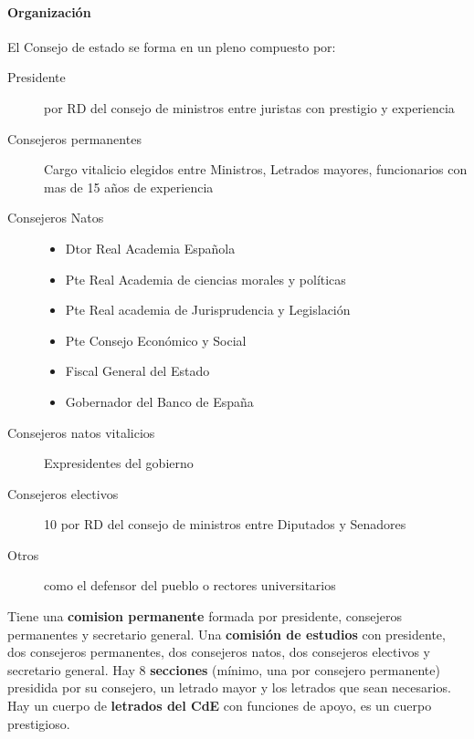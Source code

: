         \paragraph{Organización}
            El Consejo de estado se forma en un pleno compuesto por:
            \begin{description}
                \item[Presidente] por RD del consejo de ministros entre juristas con prestigio y experiencia
                \item[Consejeros permanentes] Cargo vitalicio elegidos entre Ministros, Letrados mayores, funcionarios con mas de 15 años de experiencia
                \item[Consejeros Natos] \begin{itemize}
                        \item Dtor Real Academia Española
                        \item Pte Real Academia de ciencias morales y políticas
                        \item Pte Real academia de Jurisprudencia y Legislación
                        \item Pte Consejo Económico y Social
                        \item Fiscal General del Estado
                        \item Gobernador del Banco de España
                    \end{itemize}
                \item[Consejeros natos vitalicios] Expresidentes del gobierno
                \item[Consejeros electivos] 10 por RD del consejo de ministros entre Diputados y Senadores
                \item[Otros] como el defensor del pueblo o rectores universitarios
            \end{description}

            Tiene una \textbf{comision permanente} formada por presidente, consejeros permanentes y secretario general. Una \textbf{comisión de estudios} con presidente, dos consejeros permanentes, dos consejeros natos, dos consejeros electivos y secretario general. Hay 8 \textbf{secciones} (mínimo, una por consejero permanente) presidida por su consejero, un letrado mayor y los letrados que sean necesarios. Hay un cuerpo de \textbf{letrados del CdE} con funciones de apoyo, es un cuerpo prestigioso.
